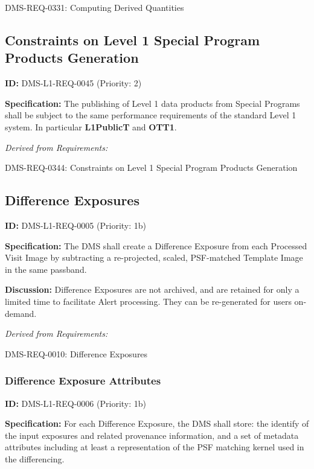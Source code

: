 \documentclass[SE,toc,lsstdraft]{lsstdoc}
\begin{document}
DMS-REQ-0331:
Computing Derived Quantities \newline

\subsection{Constraints on Level 1 Special Program Products Generation}

\label{DMS-L1-REQ-0045}
\textbf{ID:} DMS-L1-REQ-0045 (Priority: 2)

\textbf{Specification: }The publishing of Level 1 data products from Special Programs shall be subject to the same performance requirements of the standard Level 1 system. In particular \textbf{L1PublicT} and \textbf{OTT1}.

\emph{Derived from Requirements:}

DMS-REQ-0344:
Constraints on Level 1 Special Program Products Generation \newline

\subsection{Difference Exposures}

\label{DMS-L1-REQ-0005}
\textbf{ID:} DMS-L1-REQ-0005 (Priority: 1b)

\textbf{Specification:} The DMS shall create a Difference Exposure from each Processed Visit Image by subtracting a re-projected, scaled, PSF-matched Template Image in the same passband.

\textbf{Discussion:} Difference Exposures are not archived, and are retained for only a limited time to facilitate Alert processing. They can be re-generated for users on-demand.

\emph{Derived from Requirements:}

DMS-REQ-0010:
Difference Exposures \newline

\subsubsection{Difference Exposure Attributes}

\label{DMS-L1-REQ-0006}
\textbf{ID:} DMS-L1-REQ-0006 (Priority: 1b)

\textbf{Specification:} For each Difference Exposure, the DMS shall store: the identify of the input exposures and related provenance information, and a set of metadata attributes including at least a representation of the PSF matching kernel used in the differencing.
\end{document}
